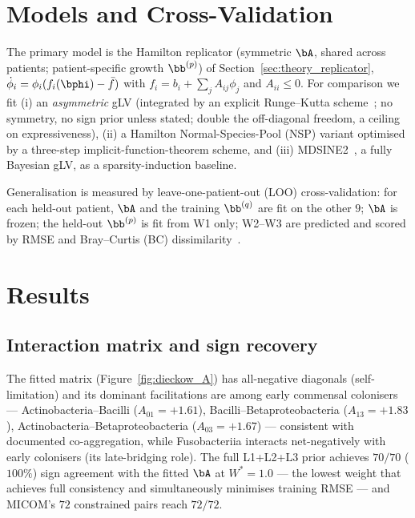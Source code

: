 \section{Models and Cross-Validation}
\label{sec:dieckow_models}

The primary model is the Hamilton replicator (symmetric $\bA$, shared across
patients; patient-specific growth $\bb^{(p)}$) of Section~\ref{sec:theory_replicator},
$\dot\phi_i=\phi_i(f_i(\bphi)-\bar f)$ with $f_i=b_i+\sum_jA_{ij}\phi_j$ and
$A_{ii}\leq0$. For comparison we fit (i) an \emph{asymmetric} gLV (integrated by an explicit Runge--Kutta scheme~\cite{Dormand1980RK45}; no symmetry, no
sign prior unless stated; double the off-diagonal freedom, a ceiling on
expressiveness), (ii) a Hamilton Normal-Species-Pool (NSP) variant optimised by a
three-step implicit-function-theorem scheme, and (iii) MDSINE2~\cite{Bucci2016MDSINE, Gibson2021MDSINE2}, a
fully Bayesian gLV, as a sparsity-induction baseline.

Generalisation is measured by leave-one-patient-out (LOO) cross-validation: for
each held-out patient, $\bA$ and the training $\bb^{(q)}$ are fit on the other
$9$; $\bA$ is frozen; the held-out $\bb^{(p)}$ is fit from W1 only; W2--W3 are
predicted and scored by RMSE and Bray--Curtis (BC) dissimilarity~\cite{Bray1957BrayCurtis, Whittaker1960Diversity}.

\section{Results}
\label{sec:dieckow_results}

\subsection{Interaction matrix and sign recovery}
\label{sec:dieckow_A}

The fitted matrix (Figure~\ref{fig:dieckow_A}) has all-negative diagonals
(self-limitation) and its dominant facilitations are among early commensal
colonisers --- Actinobacteria--Bacilli ($A_{01}=+1.61$),
Bacilli--Betaproteobacteria ($A_{13}=+1.83$), Actinobacteria--Betaproteobacteria
($A_{03}=+1.67$) --- consistent with documented co-aggregation, while Fusobacteriia
interacts net-negatively with early colonisers (its late-bridging role). The full
L1+L2+L3 prior achieves $70/70$ ($100\%$) sign agreement with the fitted $\bA$ at
$W^*{=}1.0$ --- the lowest weight that achieves full consistency and simultaneously
minimises training RMSE --- and MICOM's $72$ constrained pairs reach $72/72$.

